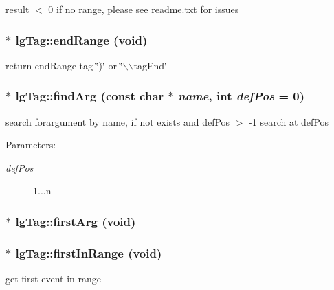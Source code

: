 result $<$ 0 if no range, please see readme.txt for issues 

\subsubsection{$\ast$ lg\-Tag::end\-Range (void)\hspace{0.3cm}{\tt  [inline]}}\label{classlgTag_a21}


return end\-Range tag \char`\"{})\char`\"{} or \char`\"{}$\backslash$$\backslash$tag\-End\char`\"{} 

\subsubsection{ $\ast$ lg\-Tag::find\-Arg (const char $\ast$ {\em name}, int {\em def\-Pos} = 0)}\label{classlgTag_a13}


search forargument by name, if not exists and def\-Pos $>$ -1 search at def\-Pos 

\begin{Desc}
\item[Parameters: ]\par
\begin{description}
\item[{\em 
def\-Pos}]1...n \end{description}
\end{Desc}
\subsubsection{ $\ast$ lg\-Tag::first\-Arg (void)}\label{classlgTag_a12}


\subsubsection{ $\ast$ lg\-Tag::first\-In\-Range (void)}\label{classlgTag_a18}


get first event in range 

